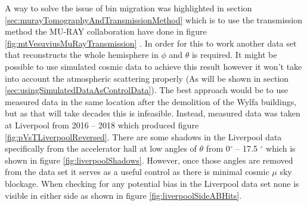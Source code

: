 A way to solve the issue of bin migration was highlighted in section \ref{sec:murayTomographyAndTransmissionMethod} which is to use the transmission method the MU-RAY collaboration have done in figure \ref{fig:mtVesuviusMuRayTransmission} \cite{Ambrosino_2014}. In order for this to work  another data set that reconstructs the whole hemisphere in $\phi$ and $\theta$ is required. It might be possible to use simulated cosmic data to achieve this result however it won't take into account the atmospheric scattering properly (As will be shown in section \ref{sec:usingSimulatedDataAsControlData}). The best approach would be to use measured data in the same location after the demolition of the Wylfa buildings, but as that will take decades this is infeasible. Instead, measured data was taken at Liverpool from 2016 -- 2018 which produced figure \ref{fig:pVsTLiverpoolReversed}. There are some shadows in the Liverpool data specifically from the accelerator hall at low angles of $\theta$ from 0$^\circ$ -- 17.5 $^\circ$ which is shown in figure \ref{fig:liverpoolShadows}. However, once those angles are removed from the data set it serves as a useful control as there is minimal cosmic $\mu$ sky blockage. When checking for any potential bias in the Liverpool data set none is visible in either side as shown in figure \ref{fig:liverpoolSideABHits}. 

